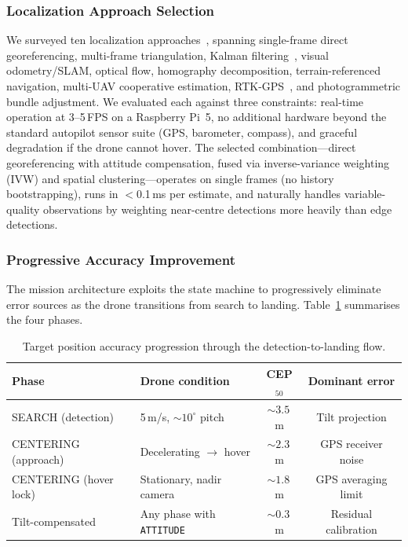 \documentclass[10pt,a4paper]{article}
\begin{document}
\subsubsection{Localization Approach Selection}

We surveyed ten localization approaches~\citep{barber2006vision,paulin2024raycast,sambolek2025person}, spanning single-frame direct georeferencing, multi-frame triangulation, Kalman filtering~\citep{kalman1960}, visual odometry/SLAM, optical flow, homography decomposition, terrain-referenced navigation, multi-UAV cooperative estimation, RTK-GPS~\citep{takasu2009development}, and photogrammetric bundle adjustment.  We evaluated each against three constraints: real-time operation at 3--5\,FPS on a Raspberry Pi~5, no additional hardware beyond the standard autopilot sensor suite (GPS, barometer, compass), and graceful degradation if the drone cannot hover.  The selected combination---direct georeferencing with attitude compensation, fused via inverse-variance weighting (IVW) and spatial clustering---operates on single frames (no history bootstrapping), runs in $<$0.1\,ms per estimate, and naturally handles variable-quality observations by weighting near-centre detections more heavily than edge detections.

\subsubsection{Progressive Accuracy Improvement}

The mission architecture exploits the state machine to progressively eliminate error sources as the drone transitions from search to landing.  Table~\ref{tab:accuracy-progression-body} summarises the four phases.

\begin{table}[H]
  \centering\small
  \caption{Target position accuracy progression through the detection-to-landing flow.}\label{tab:accuracy-progression-body}
  \begin{tabular}{@{}llcc@{}}
    \toprule
    \textbf{Phase} & \textbf{Drone condition} & \textbf{CEP$_{50}$} & \textbf{Dominant error} \\
    \midrule
    SEARCH (detection)    & 5\,m/s, ${\sim}10^{\circ}$ pitch  & ${\sim}3.5$\,m & Tilt projection \\
    CENTERING (approach)  & Decelerating $\to$ hover           & ${\sim}2.3$\,m & GPS receiver noise \\
    CENTERING (hover lock)& Stationary, nadir camera           & ${\sim}1.8$\,m & GPS averaging limit \\
    Tilt-compensated      & Any phase with \texttt{ATTITUDE}   & ${\sim}0.3$\,m & Residual calibration \\
    \bottomrule
  \end{tabular}
\end{table}
\end{document}
